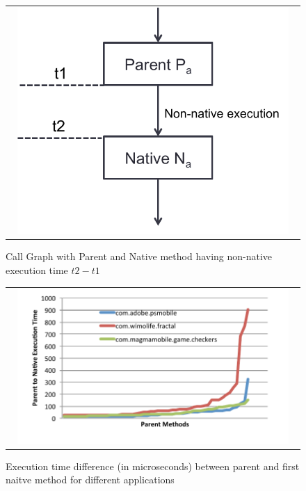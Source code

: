 \begin{figure} [thf*]
\centering
\begin{tabular}{c}
\begin{minipage}[b]{0.5\textwidth}
\includegraphics[width=0.95\textwidth]{figs/parent_native.pdf}
\end{minipage}
\end{tabular}
\caption{Call Graph with Parent and Native method having non-native execution time $t2-t1$}
\label{fig:parent_native}
\end{figure}


\begin{figure} [thf*]
\centering
\begin{tabular}{c}
\begin{minipage}[b]{0.5\textwidth}
\includegraphics[width=0.95\textwidth]{figs/ddms_parent_native.pdf}
\end{minipage}
\end{tabular}
\caption{Execution time difference (in microseconds) between parent and first naitve method for different applications}
\label{fig:ddms_native}
\end{figure}

